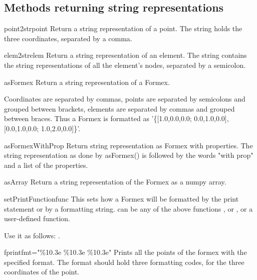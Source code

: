 \subsection{Methods returning string representations}

\begin{methoddesc}{point2str}{point}
Return a string representation of a point. The string holds the three coordinates, separated by a comma. \classmethod
\end{methoddesc}

\begin{methoddesc}{elem2str}{elem}
Return a string representation of an element. The string contains the string representations of all the element's nodes, separated by a semicolon. \classmethod
\end{methoddesc}
    
\begin{methoddesc}{asFormex}{}
Return a string representation of a Formex.

Coordinates are separated by commas, points are separated by semicolons and grouped between brackets, elements are separated by commas and grouped between braces. Thus a Formex  is formatted as '\{[1.0,0.0,0.0; 0.0,1.0,0.0], [0.0,1.0,0.0; 1.0,2.0,0.0]\}'.
\end{methoddesc}

\begin{methoddesc}{asFormexWithProp}{}
Return string representation as Formex with properties. The string representation as done by asFormex() is followed by the words "with prop" and a list of the properties.
\end{methoddesc}
              
\begin{methoddesc}{asArray}{}
Return a string representation of the Formex as a numpy array.
\end{methoddesc}

\begin{methoddesc}{setPrintFunction}{func}
This sets how a Formex will be formatted by the print statement or by a  formatting string.  can be any of the above functions ,  or , or a user-defined function. 

\classmethod
Use it as follows: .
\end{methoddesc}


\begin{methoddesc}{fprint}{fmt="\%10.3e \%10.3e \%10.3e"}
Prints all the points of the formex with the specified format. The format should hold three formatting codes, for the three coordinates of the point. 
\end{methoddesc}


